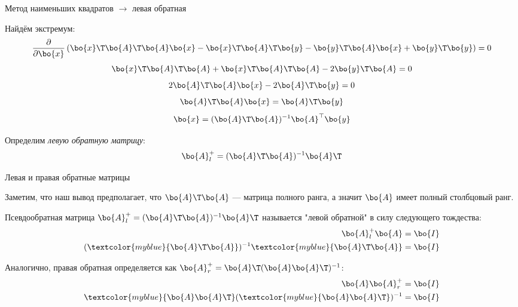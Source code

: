 \documentclass{beamer}
\begin{document}
\begin{frame}{Метод наименьших квадратов $\rightarrow$ левая обратная}
	\begin{flushleft}
		
		Найдём экстремум:
		\begin{equation}
			\frac{\partial}{\partial \bo{x}}  \left( 
			\bo{x}\T\bo{A}\T\bo{A}\bo{x}
			-\bo{x}\T\bo{A}\T\bo{y} -\bo{y}\T\bo{A}\bo{x} +  \bo{y}\T \bo{y}
			\right) 
			= 0
		\end{equation}
		\begin{equation}
			\bo{x}\T\bo{A}\T\bo{A} + \bo{x}\T\bo{A}\T\bo{A} - 2\bo{y}\T\bo{A} 
			= 0
		\end{equation}
		\begin{equation}
			2\bo{A}\T\bo{A}\bo{x} - 2\bo{A}\T\bo{y} 
			= 0
		\end{equation}
		\begin{equation}
			\bo{A}\T \bo{A}\bo{x} = \bo{A}\T\bo{y}
		\end{equation}
		\begin{equation}
			\bo{x} = (\bo{A}\T \bo{A})^{-1} \bo{A}^\top\bo{y}
		\end{equation}
		
		Определим \emph{левую обратную матрицу}:
		\begin{equation}
			\bo{A}^+_l = (\bo{A}\T \bo{A})^{-1} \bo{A}\T
		\end{equation}
		
		
	\end{flushleft}
\end{frame}



\begin{frame}{Левая и правая обратные матрицы}
	\begin{flushleft}
		
		Заметим, что наш вывод предполагает, что $\bo{A}\T \bo{A}$ — матрица полного ранга, а значит $\bo{A}$ имеет полный столбцовый ранг.
		
		\bigskip
		
		Псевдообратная матрица $\bo{A}^+_l = (\bo{A}\T \bo{A})^{-1} \bo{A}\T$ называется "левой обратной" в силу следующего тождества:
		\begin{align}
			\bo{A}^+_l  \bo{A} =  \bo{I}
			\\
			(  \textcolor{myblue} {\bo{A}\T\bo{A}})^{-1} \textcolor{myblue} {\bo{A}\T\bo{A}} =  \bo{I}
		\end{align}
		
		\bigskip
		
		Аналогично, правая обратная определяется как $\bo{A}^+_r = \bo{A}\T (\bo{A}\bo{A}\T )^{-1}$:
		\begin{align}
			\bo{A} \bo{A}^+_r=  \bo{I}
			\\
			\textcolor{myblue}{\bo{A}\bo{A}\T} (\textcolor{myblue}{\bo{A}\bo{A}\T} )^{-1} =  \bo{I}
		\end{align}
		
	\end{flushleft}
\end{frame}
\end{document}
